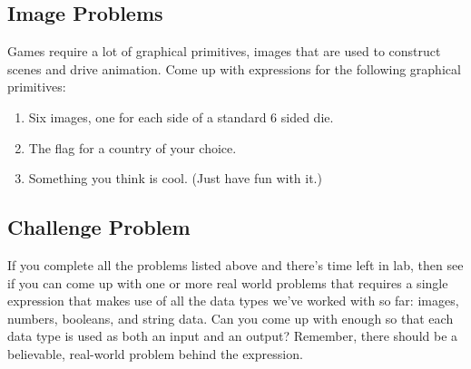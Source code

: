 \documentclass[nobib]{tufte-handout}
\begin{document}
\subsection{Image Problems}

Games require a lot of graphical primitives, images that are used to construct scenes and drive animation. Come up with expressions for the following graphical primitives:
\begin{enumerate}
  \item Six images, one for each side of a standard 6 sided die.
  \item The flag for a country of your choice.
  \item Something you think is cool. (Just have fun with it.)
\end{enumerate}

\subsection{Challenge Problem}

If you complete all the problems listed above and there's time left in lab, then see if you can come up with one or more real world problems that requires a single expression that makes use of all the data types we've worked with so far: images, numbers, booleans, and string data. Can you come up with enough so that each data type is used as both an input and an output? Remember, there should be a believable, real-world problem behind the expression.
\end{document}
